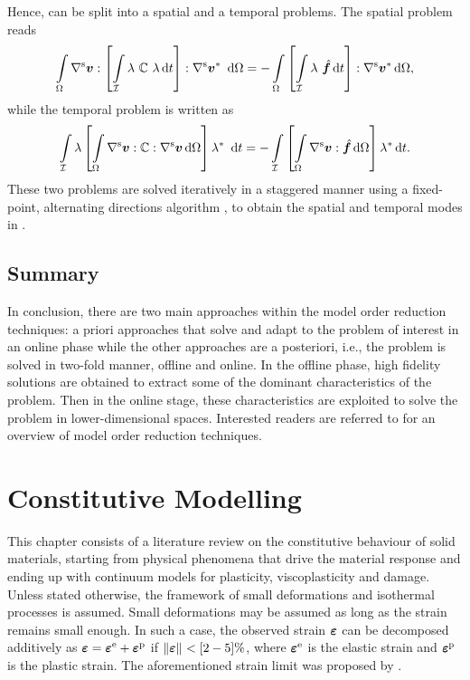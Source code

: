 Hence,  can be split into a spatial and a temporal problems. The spatial problem reads
\begin{equation}
	\int \displaylimits_\Omega {\rm \nabla^s} \mbox{$\bm  v$} : \left[ \int \displaylimits_{{\cal I}} \lambda \ {\mathbb{ C}} \ \lambda {\,\rm d} t \right] : {\rm \nabla^s} \mbox{$\bm  v$}^\ast \ {\,\rm d} \Omega = - \int \displaylimits_\Omega \left[ \int \displaylimits_{{\cal I}} \lambda \ \mbox{\ensuremath{\hat{\bm f}}} {\,\rm d} t \right] : {\rm \nabla^s} \mbox{$\bm  v$}^\ast {\,\rm d} \Omega,
\end{equation}
while the temporal problem is written as
\begin{equation}
	\int \displaylimits_{{\cal I}} \lambda \left[ \int \displaylimits_\Omega  {\rm \nabla^s} \mbox{$\bm  v$} : {\mathbb{ C}} : {\rm \nabla^s} \mbox{$\bm  v$} {\,\rm d} \Omega \right]  \lambda^\ast \ {\,\rm d} t = - \int \displaylimits_{{\cal I}} \left[ \int \displaylimits_\Omega {\rm \nabla^s} \mbox{$\bm  v$} : \mbox{\ensuremath{\hat{\bm f}}} {\,\rm d} \Omega \right] \lambda^\ast {\,\rm d} t.
\end{equation}
These two problems are solved iteratively in a staggered manner using a fixed-point, alternating directions algorithm \parencite{chinesta2014separated}, to obtain the spatial and temporal modes in .

\section{Summary}
In conclusion, there are two main approaches within the model order reduction techniques: a priori approaches that solve and adapt to the problem of interest in an online phase while the other approaches are a posteriori, i.e., the problem is solved in two-fold manner, offline and online. In the offline phase, high fidelity solutions are obtained to extract some of the dominant characteristics of the problem. Then in the online stage, these characteristics are exploited to solve the problem in lower-dimensional spaces. Interested readers are referred to \parencite{chinesta_encyclo_2018,mendoncca2019model}  for an overview of model order reduction techniques.


\chapter{Constitutive Modelling}
\label{constitutive_modelling}

This chapter consists of a literature review on the constitutive behaviour of solid materials, starting from physical phenomena that drive the material response and ending up with continuum models for plasticity, viscoplasticity and damage. Unless stated otherwise, the framework of small deformations and isothermal processes is assumed. Small deformations may be assumed as long as the strain remains small enough. In such a case, the observed strain $\mbox{$\bm \varepsilon $}$ can be decomposed additively as
$\mbox{$\bm \varepsilon $} = \mbox{$\bm \varepsilon $}^{\rm e} + \mbox{$\bm \varepsilon $}^{\rm p}$ if $\left\lVert \mbox{$\bm \varepsilon $} \right\rVert_{ }^{ } < [2-5] \%$, where $\mbox{$\bm \varepsilon $}^{\rm e}$ is the elastic strain and $\mbox{$\bm \varepsilon $}^{\rm p}$ is the plastic strain. The aforementioned strain limit was proposed by \parencite{lemaitre1994mechanics}.

